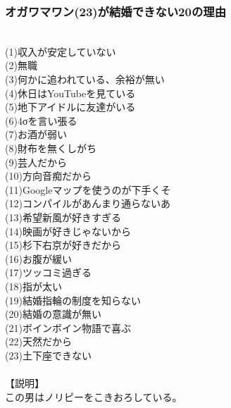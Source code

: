 \subsubsection{オガワマワン(23)が結婚できない20の理由}
　\\
(1)収入が安定していない\\
(2)無職\\
(3)何かに追われている、余裕が無い\\
(4)休日はYouTubeを見ている\\
(5)地下アイドルに友達がいる\\
(6)4σを言い張る\\
(7)お酒が弱い\\
(8)財布を無くしがち\\
(9)芸人だから\\
(10)方向音痴だから\\
(11)Googleマップを使うのが下手くそ\\
(12)コンパイルがあんまり通らないあ\\
(13)希望新風が好きすぎる\\
(14)映画が好きじゃないから\\
(15)杉下右京が好きだから\\
(16)お腹が緩い\\
(17)ツッコミ過ぎる\\
(18)指が太い\\
(19)結婚指輪の制度を知らない\\
(20)結婚の意識が無い\\
(21)ボインボイン物語で喜ぶ\\
(22)天然だから\\
(23)土下座できない\\
\\
【説明】\\
この男はノリピーをこきおろしている。\\

\newpage
